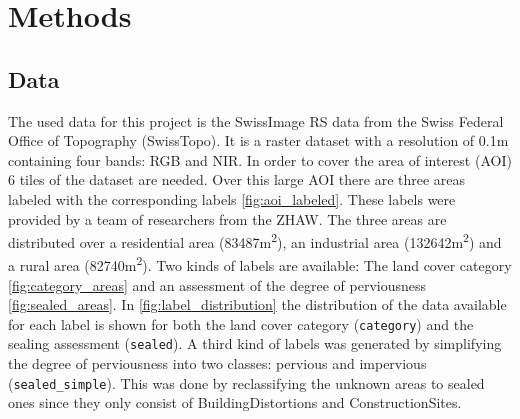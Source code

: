

\section{Methods}
\label{methods}

\subsection{Data}%

The used data for this project is the SwissImage RS \autocite{swisstopoSWISSIMAGERS2024}
data from the Swiss Federal Office of Topography (SwissTopo).
It is a raster dataset with a resolution of 0.1m containing four bands: RGB and NIR.
In order to cover the area of interest (AOI) 6 tiles of the dataset are needed.
Over this large AOI there are three areas labeled with the corresponding labels \autoref{fig:aoi_labeled}.
These labels were provided by a team of researchers from the ZHAW. The three
areas are distributed over a residential area (83487m\textsuperscript{2}),
an industrial area (132642m\textsuperscript{2}) and a rural area (82740m\textsuperscript{2}).
Two kinds of labels are available: The land cover category \autoref{fig:category_areas} and an assessment of the 
degree of perviousness \autoref{fig:sealed_areas}. In \autoref{fig:label_distribution} the distribution of
the data available for each label is shown for both the land cover category (\texttt{category}) and the sealing assessment (\texttt{sealed}).
A third kind of labels was generated by simplifying the degree of perviousness into two classes: pervious and impervious (\texttt{sealed\_simple}).
This was done by reclassifying the unknown areas to sealed ones since they only consist of BuildingDistortions and
ConstructionSites.

